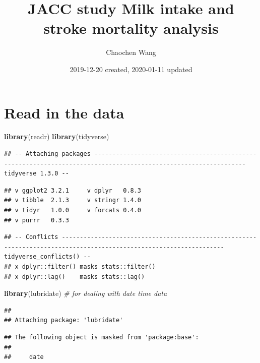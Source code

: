 \documentclass[]{article}
\title{JACC study Milk intake and stroke mortality analysis}
\author{Chaochen Wang}
\date{2019-12-20 created, 2020-01-11 updated}
\newenvironment{Shaded}{\begin{snugshade}}{\end{snugshade}}
\newcommand{\CommentTok}[1]{\textcolor[rgb]{0.56,0.35,0.01}{\textit{#1}}}
\newcommand{\KeywordTok}[1]{\textcolor[rgb]{0.13,0.29,0.53}{\textbf{#1}}}
\newcommand{\NormalTok}[1]{#1}
\begin{document}
\maketitle

{
\setcounter{tocdepth}{3}
\tableofcontents
}
\hypertarget{read-in-the-data}{%
\section{Read in the data}\label{read-in-the-data}}

\begin{Shaded}
\begin{Highlighting}[]
\KeywordTok{library}\NormalTok{(readr)}
\KeywordTok{library}\NormalTok{(tidyverse)}
\end{Highlighting}
\end{Shaded}

\begin{verbatim}
## -- Attaching packages ---------------------------------------------------------------------------------------------------------------- tidyverse 1.3.0 --
\end{verbatim}

\begin{verbatim}
## v ggplot2 3.2.1     v dplyr   0.8.3
## v tibble  2.1.3     v stringr 1.4.0
## v tidyr   1.0.0     v forcats 0.4.0
## v purrr   0.3.3
\end{verbatim}

\begin{verbatim}
## -- Conflicts ------------------------------------------------------------------------------------------------------------------- tidyverse_conflicts() --
## x dplyr::filter() masks stats::filter()
## x dplyr::lag()    masks stats::lag()
\end{verbatim}

\begin{Shaded}
\begin{Highlighting}[]
\KeywordTok{library}\NormalTok{(lubridate) }\CommentTok{# for dealing with date time data }
\end{Highlighting}
\end{Shaded}

\begin{verbatim}
## 
## Attaching package: 'lubridate'
\end{verbatim}

\begin{verbatim}
## The following object is masked from 'package:base':
## 
##     date
\end{verbatim}
\end{document}
